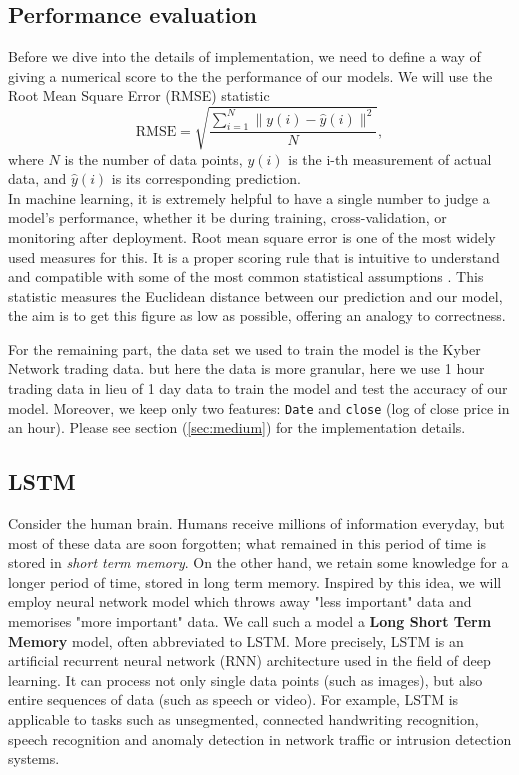 \documentclass[twoside]{report}
\newcommand{\code}{\texttt}
\begin{document}
\begin{spacing}{1}
\subsection{Performance evaluation}
Before we dive into the details of implementation, we need to define a way of giving a numerical score to the the performance of our models. We will use the Root Mean Square Error (RMSE) statistic
\[\textrm{RMSE} =\sqrt{\frac{\sum_{i=1}^{N}\|y(i)-\hat{y}(i)\|^{2}}{N}},\] where $N$ is the number of data points, $y(i)$ is the i-th measurement of actual data, and $\hat{y}(i)$ is its corresponding prediction.\\
In machine learning, it is extremely helpful to have a single number to judge a model’s performance, whether it be during training, cross-validation, or monitoring after deployment. Root mean square error is one of the most widely used measures for this. It is a proper scoring rule that is intuitive to understand and compatible with some of the most common statistical assumptions \cite{hyndman2006another}. This statistic measures the Euclidean distance between our prediction and our model, the aim is to get this figure as low as possible, offering an analogy to correctness.  

For the remaining part, the data set we used to train the model is the Kyber Network trading data. but here the data is more granular, here we use 1 hour trading data in lieu of 1 day data to train the model and test the accuracy of our model. Moreover, we keep only two features: \code{Date} and \code{close} (log of close price in an hour). Please see section (\ref{sec:medium}) for the implementation details.

\subsection{LSTM}

Consider the human brain. Humans receive millions of information everyday, but most of these data are soon forgotten; what remained in this period of time is stored in \textit{short term memory}. On the other hand, we retain some knowledge for a longer period of time, stored in long term memory. Inspired by this idea, we will employ neural network model which throws away "less important" data and memorises "more important" data. We call such a model a \textbf{Long Short Term Memory} model, often abbreviated to LSTM.
More precisely, LSTM is an artificial recurrent neural network (RNN) architecture used in the field of deep learning. It can process not only single data points (such as images), but also entire sequences of data (such as speech or video). For example, LSTM is applicable to tasks such as unsegmented, connected handwriting recognition, speech recognition and anomaly detection in network traffic or intrusion detection systems.\cite{greff2016lstm}


\end{spacing}
\end{document}
